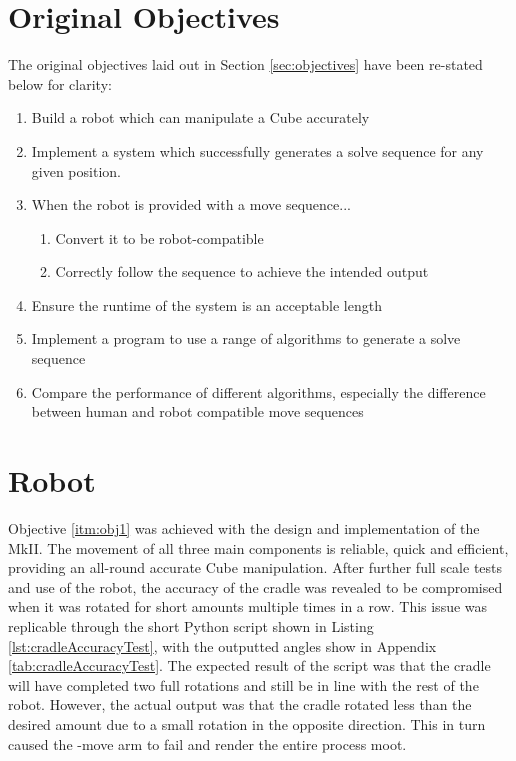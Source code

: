 \documentclass{report}
\newcommand{\move}[1]{\uppercase{\texttt{\formatmovesnospace{#1}}}-move}
\begin{document}
    \section{Original Objectives}
    
    The original objectives laid out in Section \ref{sec:objectives} have been re-stated below for clarity:
    
    \begin{enumerate}
    	\item Build a robot which can manipulate a Cube accurately \label{itm:obj1}
    	\item Implement a system which successfully generates a solve sequence for any given position. \label{itm:obj2}
    	\item When the robot is provided with a move sequence... \label{itm:obj3}
    	\begin{enumerate}
    		\item Convert it to be robot-compatible \label{itm:obj3a}
    		\item Correctly follow the sequence to achieve the intended output \label{itm:obj3b}
    	\end{enumerate}
    	\item Ensure the runtime of the system is an acceptable length \label{itm:obj4}
    	\item Implement a program to use a range of algorithms to generate a solve sequence \label{itm:obj5}
    	\item Compare the performance of different algorithms, especially the difference between human and robot compatible move sequences \label{itm:obj6}
    \end{enumerate}
    
    \section{Robot}
    
    Objective \ref{itm:obj1} was achieved with the design and implementation of the MkII. The movement of all three main components is reliable, quick and efficient, providing an all-round accurate Cube manipulation. After further full scale tests and use of the robot, the accuracy of the cradle was revealed to be compromised when it was rotated for short amounts multiple times in a row. This issue was replicable through the short Python script shown in Listing \ref{lst:cradleAccuracyTest}, with the outputted angles show in Appendix \ref{tab:cradleAccuracyTest}. The expected result of the script was that the cradle will have completed two full rotations and still be in line with the rest of the robot. However, the actual output was that the cradle rotated less than the desired amount due to a small rotation in the opposite direction. This in turn caused the \move{x} arm to fail and render the entire process moot.
\end{document}
